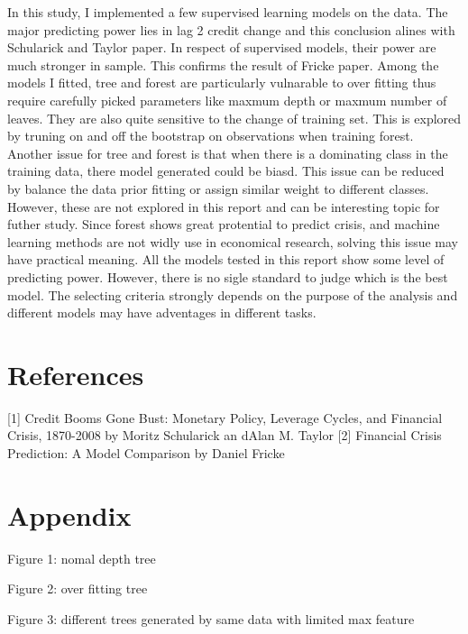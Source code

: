 \documentclass{article}
\newcommand{\ciapdf}[1]{\vspace*{-\parskip}\resizebox{0.75\textwidth}{!}{\texttt{[image: \#1]}}}
\begin{document}
In this study, I implemented
a few supervised learning models on the data. The major predicting
power lies in lag 2 credit change and this conclusion alines with
Schularick and Taylor paper. In respect of supervised models, their
power are much stronger in sample. This confirms the result of Fricke
paper. Among the models I fitted, tree and forest are particularly
vulnarable to over fitting thus require carefully picked parameters like
maxmum depth or maxmum number of leaves. They are also quite sensitive
to the change of training set. This is explored by truning on and off
the bootstrap on observations when training forest. Another issue for
tree and forest is that when there is a dominating class in the training
data, there model generated could be biasd. This issue can be reduced by
balance the data prior fitting or assign similar weight to different
classes. However, these are not explored in this report and can be
interesting topic for futher study. Since forest shows great protential
to predict crisis, and machine learning methods are not widly use in
economical research, solving this issue may have practical meaning. All
the models tested in this report show some level of predicting power.
However, there is no sigle standard to judge which is the best model.
The selecting criteria strongly depends on the purpose of the analysis
and different models may have adventages in different tasks.

\section*{References}

{[}1{]} Credit Booms Gone Bust: Monetary Policy, Leverage Cycles, and
Financial Crisis, 1870-2008 by Moritz Schularick an dAlan M. Taylor
{[}2{]} Financial Crisis Prediction: A Model Comparison by Daniel Fricke

\section*{Appendix}

Figure 1: nomal depth tree

\ciapdf{app_normaldepth.pdf}

Figure 2: over fitting tree 

\ciapdf{app_overfitting.pdf}

Figure 3:
different trees generated by same data with limited max feature
\end{document}
